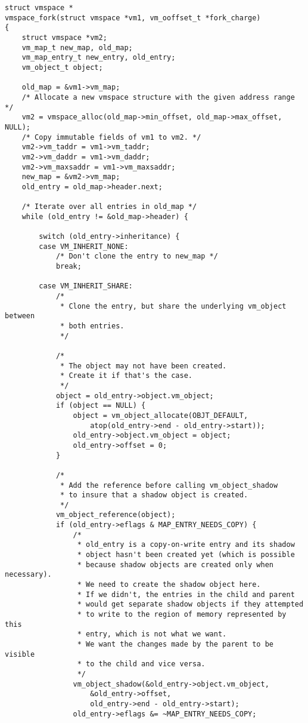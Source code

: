 \documentclass[shortabstract, english]{iithesis}
\newenvironment{code}{}{}
\begin{document}
\begin{code}
\begin{verbatim}
struct vmspace *
vmspace_fork(struct vmspace *vm1, vm_ooffset_t *fork_charge)
{
    struct vmspace *vm2;
    vm_map_t new_map, old_map;
    vm_map_entry_t new_entry, old_entry;
    vm_object_t object;

    old_map = &vm1->vm_map;
    /* Allocate a new vmspace structure with the given address range */
    vm2 = vmspace_alloc(old_map->min_offset, old_map->max_offset, NULL);
    /* Copy immutable fields of vm1 to vm2. */
    vm2->vm_taddr = vm1->vm_taddr;
    vm2->vm_daddr = vm1->vm_daddr;
    vm2->vm_maxsaddr = vm1->vm_maxsaddr;
    new_map = &vm2->vm_map;
    old_entry = old_map->header.next;

    /* Iterate over all entries in old_map */
    while (old_entry != &old_map->header) {

        switch (old_entry->inheritance) {
        case VM_INHERIT_NONE:
            /* Don't clone the entry to new_map */
            break;

        case VM_INHERIT_SHARE:
            /*
             * Clone the entry, but share the underlying vm_object between
             * both entries.
             */

            /*
             * The object may not have been created.
             * Create it if that's the case.
             */
            object = old_entry->object.vm_object;
            if (object == NULL) {
                object = vm_object_allocate(OBJT_DEFAULT,
                    atop(old_entry->end - old_entry->start));
                old_entry->object.vm_object = object;
                old_entry->offset = 0;
            }

            /*
             * Add the reference before calling vm_object_shadow
             * to insure that a shadow object is created.
             */
            vm_object_reference(object);
            if (old_entry->eflags & MAP_ENTRY_NEEDS_COPY) {
                /*
                 * old_entry is a copy-on-write entry and its shadow
                 * object hasn't been created yet (which is possible
                 * because shadow objects are created only when necessary).
                 * We need to create the shadow object here.
                 * If we didn't, the entries in the child and parent
                 * would get separate shadow objects if they attempted
                 * to write to the region of memory represented by this
                 * entry, which is not what we want.
                 * We want the changes made by the parent to be visible
                 * to the child and vice versa.
                 */
                vm_object_shadow(&old_entry->object.vm_object,
                    &old_entry->offset,
                    old_entry->end - old_entry->start);
                old_entry->eflags &= ~MAP_ENTRY_NEEDS_COPY;


\end{verbatim}
\end{code}
\end{document}
